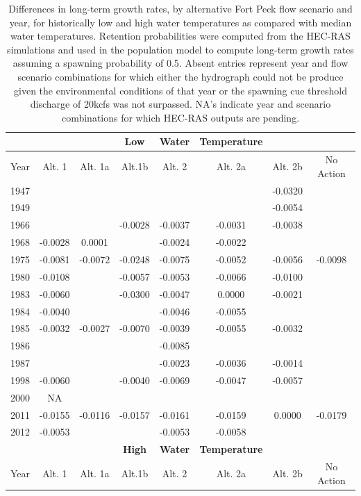 \documentclass[12pt]{article}
\begin{document}
\begin{table}[h!]
\caption{Differences in long-term growth rates, by alternative Fort Peck flow scenario and year, for historically low and high water temperatures as compared with median water temperatures.  Retention probabilities were computed from the HEC-RAS simulations and used in the population model to compute long-term growth rates assuming a spawning probability of 0.5.  Absent entries represent year and flow scenario combinations for which either the hydrograph could not be produce given the environmental conditions of that year or the spawning cue threshold discharge of 20kcfs was not surpassed.  NA's indicate year and scenario combinations for which HEC-RAS outputs are pending.}
\centering
\begin{tabular}{cccccccc}
\hline
&&& \textbf{Low} & \textbf{Water} & \textbf{Temperature} &&\\
\hline
Year & Alt. 1 & Alt. 1a & Alt.1b & Alt. 2 & Alt. 2a & Alt. 2b & No Action\\ 
1947	& & & & & & -0.0320 &\\
1949	& & & & & & -0.0054 &\\
1966 & & & -0.0028 & -0.0037 & -0.0031 & -0.0038 & \\
1968 & -0.0028	& 0.0001	&		&	-0.0024 & -0.0022 & & \\
1975 & -0.0081	& -0.0072	& -0.0248	&	-0.0075 & -0.0052 & -0.0056 & -0.0098\\
1980 & -0.0108	&		&	-0.0057 & -0.0053 & -0.0066 & -0.0100 & \\
1983 & -0.0060 & &	-0.0300 & -0.0047 & 0.0000 & -0.0021 & \\
1984 & -0.0040	&		&		&	-0.0046 & -0.0055 & & \\
1985 & -0.0032	&	-0.0027	&	-0.0070 & -0.0039 & -0.0055 & -0.0032 & \\
1986 & &		&		&	-0.0085 & & & \\
1987 & &		&		&	-0.0023 & -0.0036 & -0.0014 & \\
1998 & -0.0060	&		&	-0.0040 & -0.0069 & -0.0047 & -0.0057 & \\
2000	& NA & & & & & & \\	
2011 & -0.0155 & -0.0116 & -0.0157 & -0.0161 & -0.0159 & 0.0000 & -0.0179\\
2012 & -0.0053 & & & -0.0053 & -0.0058 & & \\		
\hline
&&& \textbf{High} & \textbf{Water} & \textbf{Temperature} &&\\
\hline
Year  & Alt. 1 & Alt. 1a & Alt.1b & Alt. 2 & Alt. 2a & Alt. 2b & No Action\\ 

\end{tabular}
\end{table}
\end{document}
